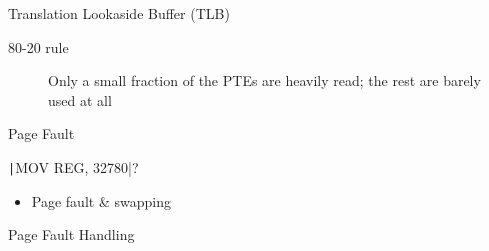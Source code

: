 \begin{frame}{Translation Lookaside Buffer (TLB)}
  \begin{description}
  \item[80-20 rule] Only a small fraction of the PTEs are heavily read; the rest are
    barely used at all
  \end{description}
  \begin{center}
  \end{center}
\end{frame}

\begin{frame}[fragile]{Page Fault}
  \begin{varwidth}{.48\textwidth}
    \begin{center}
    \end{center}
  \end{varwidth}\hfill
  \begin{varwidth}{.48\textwidth}
    \texttt|MOV REG, 32780|?
    \begin{itemize}
    \item[\Symbol{➠}] Page fault \& swapping
    \end{itemize}
  \end{varwidth}
\end{frame}

\begin{frame}{Page Fault Handling}
  \begin{center}
  \end{center}
\end{frame}


